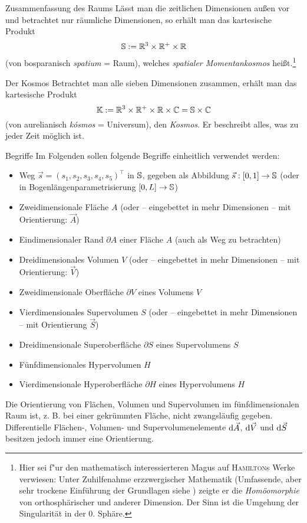 \begin{bla}{Zusammenfassung des Raums}
Lässt man die zeitlichen Dimensionen außen vor und betrachtet nur räumliche Dimensionen, so erhält man das kartesische Produkt
\begin{equation}
\mathbb{S}:=\mathbb{R}^3\times\mathbb{R}^+\times\mathbb{R}
\end{equation}
(von bosparanisch \emph{spatium} = Raum), welches \emph{spatialer Momentankosmos} heißt.\footnote{Hier sei f"ur den mathematisch interessierteren Magus auf \textsc{Hamilton}s Werke verwiesen: Unter Zuhilfenahme erzzwergischer Mathematik (Umfassende, aber sehr trockene Einführung der Grundlagen siehe \cite{erzzwerge}) zeigte er die \emph{Homöomorphie} von orthosphärischer und anderer Dimension. Der Sinn ist die Umgehung der Singularität in der 0. Sphäre.}
\end{bla}
\begin{bla}{Der Kosmos}
Betrachtet man alle sieben Dimensionen zusammen, erhält man das kartesische Produkt
\begin{equation}
\mathbb{K}:=\mathbb{R}^3\times\mathbb{R}^+\times\mathbb{R}\times\mathbb{C}=\mathbb{S}\times\mathbb{C}
\end{equation}
(von aurelianisch \emph{kósmos} = Universum), den \emph{Kosmos}. Er beschreibt alles, was zu jeder Zeit möglich ist.
\end{bla}
\begin{bla}{Begriffe}
Im Folgenden sollen folgende Begriffe einheitlich verwendet werden:
\begin{itemize}
\item
Weg $\vec{s}=(s_1,s_2,s_3,s_4,s_5)^\top$ in $\mathbb{S}$, gegeben als Abbildung $\vec{s}: [0,1]\to\mathbb{S}$ (oder in Bogenlängenparametrisierung $[0,L]\to\mathbb{S}$)
\item
Zweidimensionale Fläche $A$ (oder -- eingebettet in mehr Dimensionen -- mit Orientierung: $\vec{A}$)
\item
Eindimensionaler Rand $\partial A$ einer Fläche $A$ (auch als Weg zu betrachten)
\item
Dreidimensionales Volumen $V$ (oder -- eingebettet in mehr Dimensionen -- mit Orientierung: $\vec{V}$)
\item
Zweidimensionale Oberfläche $\partial V$ eines Volumens $V$
\item
Vierdimensionales Supervolumen $S$ (oder -- eingebettet in mehr Dimensionen -- mit Orientierung $\vec{S}$)
\item
Dreidimensionale Superoberfläche $\partial S$ eines Supervolumens $S$
\item
Fünfdimensionales Hypervolumen $H$
\item
Vierdimensionale Hyperoberfläche $\partial H$ eines Hypervolumens $H$
\end{itemize}
Die Orientierung von Flächen, Volumen und Supervolumen im fünfdimensionalen Raum ist, z. B. bei einer gekrümmten Fläche, nicht zwangsläufig gegeben. Differentielle Flächen-, Volumen- und Supervolumenelemente $\text{\rmfamily d} \vec{A}$, $\text{\rmfamily d} \vec{V}$ und $\text{\rmfamily d} \vec{S}$ besitzen jedoch immer eine Orientierung.
\end{bla}
